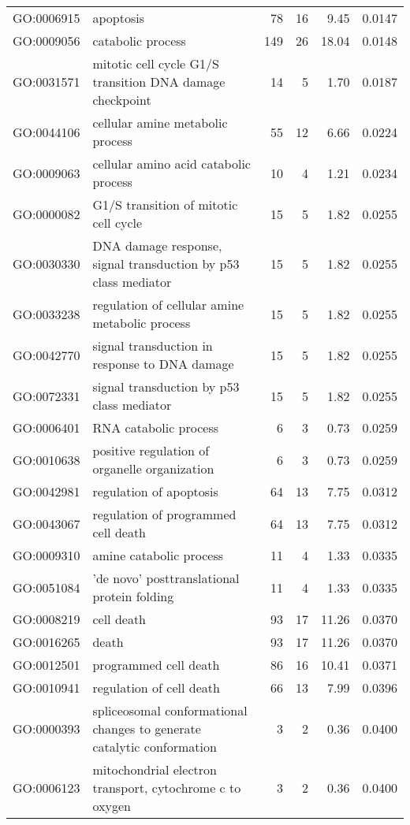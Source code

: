 \begin{longtable}{lp{4.5cm}rrrl}
  GO:0006915 & apoptosis &  78 &  16 & 9.45 & 0.0147 \\ 
  GO:0009056 & catabolic process & 149 &  26 & 18.04 & 0.0148 \\ 
  GO:0031571 & mitotic cell cycle G1/S transition DNA damage checkpoint &  14 &   5 & 1.70 & 0.0187 \\ 
  GO:0044106 & cellular amine metabolic process &  55 &  12 & 6.66 & 0.0224 \\ 
  GO:0009063 & cellular amino acid catabolic process &  10 &   4 & 1.21 & 0.0234 \\ 
  GO:0000082 & G1/S transition of mitotic cell cycle &  15 &   5 & 1.82 & 0.0255 \\ 
  GO:0030330 & DNA damage response, signal transduction by p53 class mediator &  15 &   5 & 1.82 & 0.0255 \\ 
  GO:0033238 & regulation of cellular amine metabolic process &  15 &   5 & 1.82 & 0.0255 \\ 
  GO:0042770 & signal transduction in response to DNA damage &  15 &   5 & 1.82 & 0.0255 \\ 
  GO:0072331 & signal transduction by p53 class mediator &  15 &   5 & 1.82 & 0.0255 \\ 
  GO:0006401 & RNA catabolic process &   6 &   3 & 0.73 & 0.0259 \\ 
  GO:0010638 & positive regulation of organelle organization &   6 &   3 & 0.73 & 0.0259 \\ 
  GO:0042981 & regulation of apoptosis &  64 &  13 & 7.75 & 0.0312 \\ 
  GO:0043067 & regulation of programmed cell death &  64 &  13 & 7.75 & 0.0312 \\ 
  GO:0009310 & amine catabolic process &  11 &   4 & 1.33 & 0.0335 \\ 
  GO:0051084 & 'de novo' posttranslational protein folding &  11 &   4 & 1.33 & 0.0335 \\ 
  GO:0008219 & cell death &  93 &  17 & 11.26 & 0.0370 \\ 
  GO:0016265 & death &  93 &  17 & 11.26 & 0.0370 \\ 
  GO:0012501 & programmed cell death &  86 &  16 & 10.41 & 0.0371 \\ 
  GO:0010941 & regulation of cell death &  66 &  13 & 7.99 & 0.0396 \\ 
  GO:0000393 & spliceosomal conformational changes to generate catalytic conformation &   3 &   2 & 0.36 & 0.0400 \\ 
  GO:0006123 & mitochondrial electron transport, cytochrome c to oxygen &   3 &   2 & 0.36 & 0.0400 \\ 

\end{longtable}
